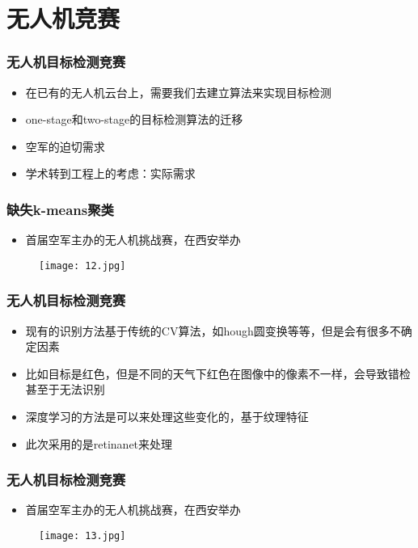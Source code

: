 \section{无人机竞赛}

\begin{frame}
    \frametitle{无人机目标检测竞赛}
    \begin{itemize}
        \item 在已有的无人机云台上，需要我们去建立算法来实现目标检测
        \item one-stage和two-stage的目标检测算法的迁移
        \item 空军的迫切需求
        \item 学术转到工程上的考虑：实际需求
    \end{itemize}
\end{frame}

\begin{frame}
    \frametitle{缺失k-means聚类}
    \begin{itemize}
        \item 首届空军主办的无人机挑战赛，在西安举办
    \end{itemize} 
    \begin{figure}
        \texttt{[image: 12.jpg]} 
    \end{figure}          
\end{frame}

\begin{frame}
    \frametitle{无人机目标检测竞赛}
    \begin{itemize}
        \item 现有的识别方法基于传统的CV算法，如hough圆变换等等，但是会有很多不确定因素
        \item 比如目标是红色，但是不同的天气下红色在图像中的像素不一样，会导致错检甚至于无法识别
        \item 深度学习的方法是可以来处理这些变化的，基于纹理特征
        \item 此次采用的是retinanet来处理
    \end{itemize}
\end{frame}

\begin{frame}
    \frametitle{无人机目标检测竞赛}
    \begin{itemize}
        \item 首届空军主办的无人机挑战赛，在西安举办
    \end{itemize} 
    \begin{figure}
        \texttt{[image: 13.jpg]} 
    \end{figure}          
\end{frame}

